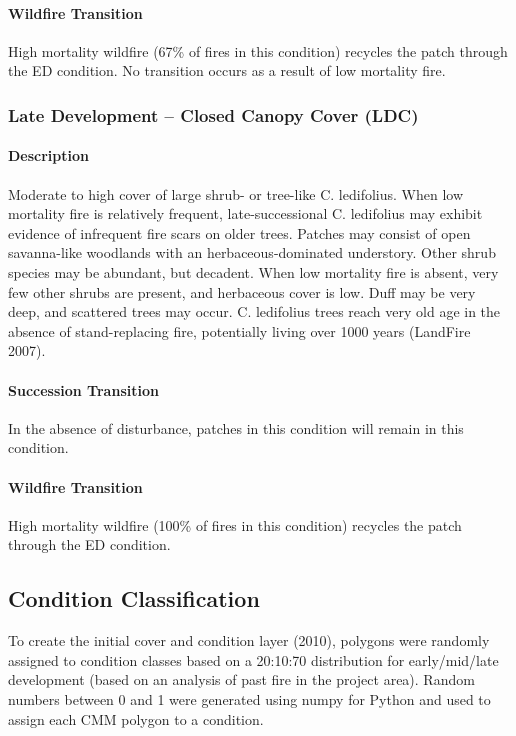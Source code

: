 \paragraph{Wildfire Transition} High mortality wildfire (67\% of fires in this condition) recycles the patch through the ED condition. No transition occurs as a result of low mortality fire.

\hrulefill


\subsubsection{Late Development – Closed Canopy Cover (LDC)}

\paragraph{Description} Moderate to high cover of large shrub- or tree-like C. ledifolius. When low mortality fire is relatively frequent, late-successional C. ledifolius may exhibit evidence of infrequent fire scars on older trees. Patches may consist of open savanna-like woodlands with an herbaceous-dominated understory. Other shrub species may be abundant, but decadent. When low mortality fire is absent, very few other shrubs are present, and herbaceous cover is low. Duff may be very deep, and scattered trees may occur. C. ledifolius trees reach very old age in the absence of stand-replacing fire, potentially living over 1000 years (LandFire 2007).

\paragraph{Succession Transition} In the absence of disturbance, patches in this condition will remain in this condition. 

\paragraph{Wildfire Transition} High mortality wildfire (100\% of fires in this condition) recycles the patch through the ED condition.

\hrulefill

\subsection{Condition Classification}
To create the initial cover and condition layer (2010), polygons were randomly assigned to condition classes based on a 20:10:70 distribution for early/mid/late development (based on an analysis of past fire in the project area). Random numbers between 0 and 1 were generated using numpy for Python and used to assign each CMM polygon to a condition.

